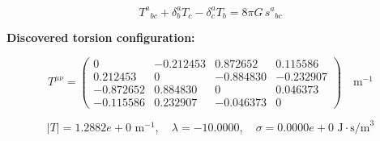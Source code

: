 
\begin{equation}
  T^a{}_{bc} + \delta^a_b T_c - \delta^a_c T_b = 8\pi G \, s^a{}_{bc}
\end{equation}

\textbf{Discovered torsion configuration:}

\begin{equation}
  T^{\mu\nu} = \begin{pmatrix}
    0 & -0.212453 & 0.872652 & 0.115586 \\
    0.212453 & 0 & -0.884830 & -0.232907 \\
    -0.872652 & 0.884830 & 0 & 0.046373 \\
    -0.115586 & 0.232907 & -0.046373 & 0
  \end{pmatrix} \quad \text{m}^{-1}
\end{equation}

\begin{equation}
  |T| = 1.2882e+0 \text{ m}^{-1}, \quad
  \lambda = -10.0000, \quad
  \sigma = 0.0000e+0 \text{ J}\cdot\text{s/m}^3
\end{equation}